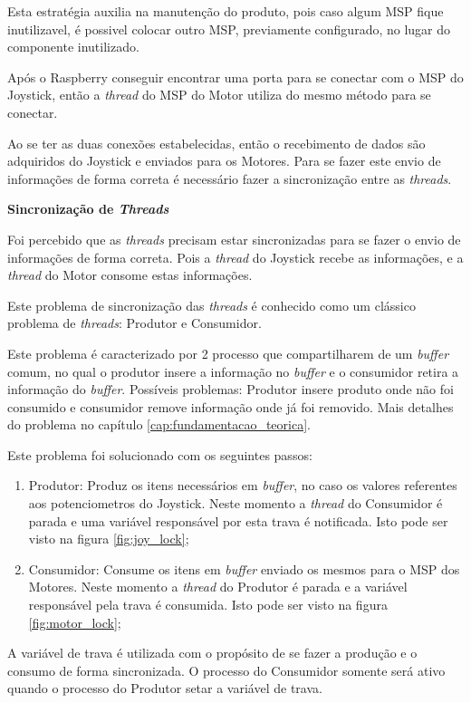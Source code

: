   Esta estratégia auxilia na manutenção do produto, pois caso algum MSP fique inutilizavel, é possivel colocar outro MSP, previamente configurado, no lugar do componente inutilizado.

  Após o Raspberry conseguir encontrar uma porta para se conectar com o MSP do Joystick, então a \textit{thread} do MSP do Motor utiliza do mesmo método para se conectar.

  Ao se ter as duas conexões estabelecidas, então o recebimento de dados são adquiridos do Joystick e enviados para os Motores. Para se fazer este envio de informações de forma correta é necessário fazer a sincronização entre as \textit{threads}.

  \textbf{Sincronização de \textit{Threads}}

  Foi percebido que as \textit{threads} precisam estar sincronizadas para se fazer o envio de informações de forma correta. Pois a \textit{thread} do Joystick recebe as informações, e a \textit{thread} do Motor consome estas informações.

  Este problema de sincronização das \textit{threads} é conhecido como um clássico problema de \textit{threads}: Produtor e Consumidor.

  Este problema é caracterizado por 2 processo que compartilharem de um \textit{buffer} comum, no qual o produtor insere a informação no \textit{buffer} e o consumidor retira a informação do \textit{buffer}. Possíveis problemas: Produtor insere produto onde não foi consumido e consumidor remove informação onde já foi removido. Mais detalhes do problema no capítulo \ref{cap:fundamentacao_teorica}.

  Este problema foi solucionado com os seguintes passos:
  \begin{enumerate}
    \item Produtor: Produz os itens necessários em \textit{buffer}, no caso os valores referentes aos potenciometros do Joystick. Neste momento a \textit{thread} do Consumidor é parada e uma variável responsável por esta trava é notificada. Isto pode ser visto na figura \ref{fig:joy_lock};
    \item Consumidor: Consume os itens em \textit{buffer} enviado os mesmos para o MSP dos Motores. Neste momento a \textit{thread} do Produtor é parada e a variável responsável pela trava é consumida. Isto pode ser visto na figura \ref{fig:motor_lock};
  \end{enumerate}

  A variável de trava é utilizada com o propósito de se fazer a produção e o consumo de forma sincronizada. O processo do Consumidor somente será ativo quando o processo do Produtor setar a variável de trava.


